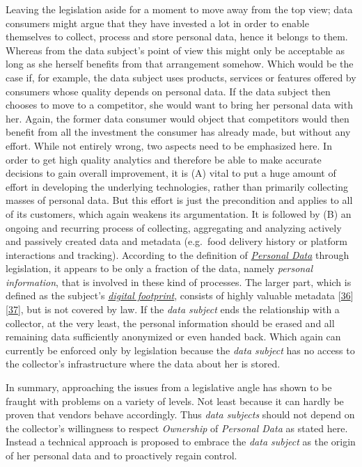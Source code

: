 \documentclass[12pt,english,a4paper,titlepage,cleardoublepage=empty,dottedtoc]{report}
\begin{document}
Leaving the legislation aside for a moment to move away from the top
view; data consumers might argue that they have invested a lot in order
to enable themselves to collect, process and store personal data, hence
it belongs to them. Whereas from the data subject's point of view this
might only be acceptable as long as she herself benefits from that
arrangement somehow. Which would be the case if, for example, the data
subject uses products, services or features offered by consumers whose
quality depends on personal data. If the data subject then chooses to
move to a competitor, she would want to bring her personal data with
her. Again, the former data consumer would object that competitors would
then benefit from all the investment the consumer has already made, but
without any effort. While not entirely wrong, two aspects need to be
emphasized here. In order to get high quality analytics and therefore be
able to make accurate decisions to gain overall improvement, it is (A)
vital to put a huge amount of effort in developing the underlying
technologies, rather than primarily collecting masses of personal data.
But this effort is just the precondition and applies to all of its
customers, which again weakens its argumentation. It is followed by (B)
an ongoing and recurring process of collecting, aggregating and
analyzing actively and passively created data and metadata (e.g.~food
delivery history or platform interactions and tracking). According to
the definition of
\emph{\protect\hyperlink{def--personal-data-as-of-legis}{Personal Data}}
through legislation, it appears to be only a fraction of the data,
namely \emph{personal information}, that is involved in these kind of
processes. The larger part, which is defined as the subject's
\emph{\protect\hyperlink{terminologies--digital-footprint}{digital
footprint}}, consists of highly valuable metadata
{[}\protect\hyperlink{ref-web_2013_why-metadata-matters}{36}{]}
{[}\protect\hyperlink{ref-web_2016_why-you-need-metadata-for-big-data-to-success}{37}{]},
but is not covered by law. If the \emph{data subject} ends the
relationship with a collector, at the very least, the personal
information should be erased and all remaining data sufficiently
anonymized or even handed back. Which again can currently be enforced
only by legislation because the \emph{data subject} has no access to the
collector's infrastructure where the data about her is stored.

In summary, approaching the issues from a legislative angle has shown to
be fraught with problems on a variety of levels. Not least because it
can hardly be proven that vendors behave accordingly. Thus \emph{data
subjects} should not depend on the collector's willingness to respect
\emph{Ownership} of \emph{Personal Data} as stated here. Instead a
technical approach is proposed to embrace the \emph{data subject} as the
origin of her personal data and to proactively regain control.
\end{document}
